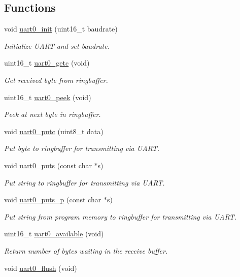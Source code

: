\subsection*{Functions}
\begin{DoxyCompactItemize}
\item 
void \hyperlink{group__avr-uart_ga51de0a3b835652d285f354c078669e75}{uart0\-\_\-init} (uint16\-\_\-t baudrate)
\begin{DoxyCompactList}\small\item\em Initialize U\-A\-R\-T and set baudrate. \end{DoxyCompactList}\item 
uint16\-\_\-t \hyperlink{group__avr-uart_ga35407e8f77fa39c1a6b8504707b13dd2}{uart0\-\_\-getc} (void)
\begin{DoxyCompactList}\small\item\em Get received byte from ringbuffer. \end{DoxyCompactList}\item 
uint16\-\_\-t \hyperlink{group__avr-uart_ga7f0372a14af24f02f5c6615afd6671a0}{uart0\-\_\-peek} (void)
\begin{DoxyCompactList}\small\item\em Peek at next byte in ringbuffer. \end{DoxyCompactList}\item 
void \hyperlink{group__avr-uart_gaf52cb65e977992c01d1f2b7220243f94}{uart0\-\_\-putc} (uint8\-\_\-t data)
\begin{DoxyCompactList}\small\item\em Put byte to ringbuffer for transmitting via U\-A\-R\-T. \end{DoxyCompactList}\item 
void \hyperlink{group__avr-uart_gaeff5f5ff60334be95f0b895f96c10998}{uart0\-\_\-puts} (const char $\ast$s)
\begin{DoxyCompactList}\small\item\em Put string to ringbuffer for transmitting via U\-A\-R\-T. \end{DoxyCompactList}\item 
void \hyperlink{group__avr-uart_gad55b367ecb822ff1c172c78af6013fe5}{uart0\-\_\-puts\-\_\-p} (const char $\ast$s)
\begin{DoxyCompactList}\small\item\em Put string from program memory to ringbuffer for transmitting via U\-A\-R\-T. \end{DoxyCompactList}\item 
uint16\-\_\-t \hyperlink{group__avr-uart_gac369ee64442157556e517078029e9aab}{uart0\-\_\-available} (void)
\begin{DoxyCompactList}\small\item\em Return number of bytes waiting in the receive buffer. \end{DoxyCompactList}\item 
\hypertarget{group__avr-uart_gab3e2b412a31f1d05a9a5be70f4b01109}{void \hyperlink{group__avr-uart_gab3e2b412a31f1d05a9a5be70f4b01109}{uart0\-\_\-flush} (void)}\label{group__avr-uart_gab3e2b412a31f1d05a9a5be70f4b01109}


\end{DoxyCompactItemize}
